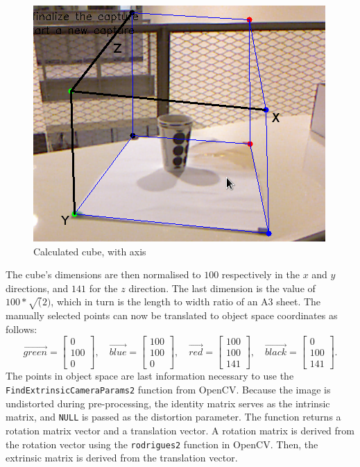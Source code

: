 \begin{figure}[H]
\centering
\includegraphics[scale=0.5]{images/axis.png}
\caption{Calculated cube, with axis}
\label{fig:axis}
\end{figure}

The cube's dimensions are then normalised to $100$ respectively in the $x$ and
$y$ directions, and $141$ for the $z$ direction. The last dimension is the value
of $100 * \sqrt(2)$, which in turn is the length to width ratio of an A3 sheet.
The manually selected points can now be translated to object space coordinates
as follows:
$$
\vec{green} = \left[ \begin{array}{ccc} 
0\\
100\\
0  \end{array} \right], \quad
\vec{blue} = \left[ \begin{array}{ccc} 
100\\
100\\
0  \end{array} \right], \quad
\vec{red} = \left[ \begin{array}{ccc} 
100\\
100\\
141  \end{array} \right], \quad
\vec{black} = \left[ \begin{array}{ccc} 
0\\
100\\
141  \end{array} \right].
$$
The points in object space are last information necessary to use the
\texttt{FindExtrinsic\-CameraParams2} function from OpenCV. Because the image is
undistorted during pre-processing, the identity matrix serves as the intrinsic
matrix, and \texttt{NULL} is passed as the distortion parameter. The function
returns a rotation matrix vector and a translation vector. A rotation matrix is
derived from the rotation vector using the \texttt{rodrigues2} function in
OpenCV. Then, the extrinsic matrix is derived from the translation vector. 

